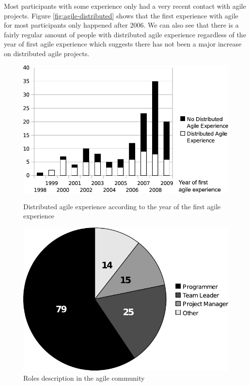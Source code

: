 \documentclass[lnbip]{svmultln}
\begin{document}
Most participants with some experience only had a very recent contact
with agile projects. Figure \ref{fig:agile-distributed} shows that the
first experience with agile for most participants only happened after
2006. We can also see that there is a fairly regular amount of people
with distributed agile experience regardless of the year of first
agile experience which suggests there has not been a major increase on
distributed agile projects.

\begin{figure}[htb]
  \begin{minipage}[t]{0.55\linewidth}
    \centering
    \includegraphics[scale=.45]{agile-distributed.pdf}
    \caption{Distributed agile experience according to the year of the
      first agile experience}
    \label{fig:agile-distributed}
  \end{minipage}
  \begin{minipage}[t]{0.45\linewidth}
    \centering
    \includegraphics[scale=.45]{agile-roles.pdf}
    \caption{Roles description in the agile community}
    \label{fig:agile-roles}
  \end{minipage}
\end{figure}
\end{document}
